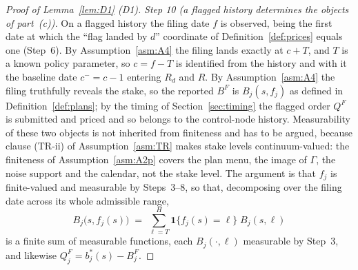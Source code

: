 \documentclass[11pt]{article}
\newcommand{\ind}{\mathbf{1}}
\begin{document}
\begin{proof}[Proof of Lemma~\ref{lem:D1} (D1)]
\emph{Step 10 (a flagged history determines the objects of part~(c)).} On a flagged history the
filing date $f$ is observed, being the first date at which the ``flag landed by $d$'' coordinate of
Definition~\ref{def:prices} equals one (Step~6). By Assumption~\ref{asm:A4} the filing lands exactly
at $c+T$, and $T$ is a known policy parameter, so $c = f-T$ is identified from the history and with
it the baseline date $c^- = c-1$ entering $R_d$ and $R$. By Assumption~\ref{asm:A4} the filing
truthfully reveals the stake, so the reported $B^F$ is $B_j(s,f_j)$ as defined in
Definition~\ref{def:plans}; by the timing of Section~\ref{sec:timing} the flagged order $Q^F$ is
submitted and priced and so belongs to the control-node history. Measurability of these two objects
is not inherited from finiteness and has to be argued, because clause (TR-ii) of
Assumption~\ref{asm:TR} makes stake levels continuum-valued: the finiteness of
Assumption~\ref{asm:A2p} covers the plan menu, the image of $\Gamma$, the noise support and the
calendar, not the stake level. The argument is that $f_j$ is finite-valued and measurable by
Steps~3--8, so that, decomposing over the filing date across its whole admissible range,
\begin{equation}
\label{eq:D1-BFmeas}
B_j\bigl(s,f_j(s)\bigr) \;=\; \sum_{\ell=T}^{H} \ind\{f_j(s) = \ell\}\;B_j(s,\ell)
\end{equation}
is a finite sum of measurable functions, each $B_j(\cdot,\ell)$ measurable by Step~3, and likewise
$Q_j^F = b_j^*(s) - B_j^F$.


\end{proof}
\end{document}
